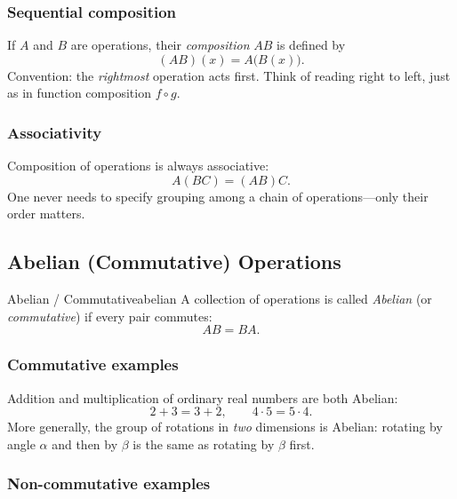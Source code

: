 \documentclass[11pt,a4paper]{article}
\begin{document}
\subsubsection{Sequential composition}

If $A$ and $B$ are operations, their \emph{composition} $AB$ is defined by
\[
  (AB)(x) = A\bigl(B(x)\bigr).
\]
Convention: the \emph{rightmost} operation acts first.  Think of reading right
to left, just as in function composition $f \circ g$.

\subsubsection{Associativity}

Composition of operations is always associative:
\[
  A(BC) = (AB)C.
\]
One never needs to specify grouping among a chain of operations---only their
order matters.

\subsection{Abelian (Commutative) Operations}

\begin{defn}{Abelian / Commutative}{abelian}
  A collection of operations is called \emph{Abelian} (or \emph{commutative})
  if every pair commutes:
  \[
    AB = BA.
  \]
\end{defn}

\subsubsection{Commutative examples}

Addition and multiplication of ordinary real numbers are both Abelian:
\[
  2 + 3 = 3 + 2, \qquad 4 \cdot 5 = 5 \cdot 4.
\]
More generally, the group of rotations in \emph{two} dimensions is Abelian:
rotating by angle $\alpha$ and then by $\beta$ is the same as rotating by
$\beta$ first.

\subsubsection{Non-commutative examples}
\end{document}
